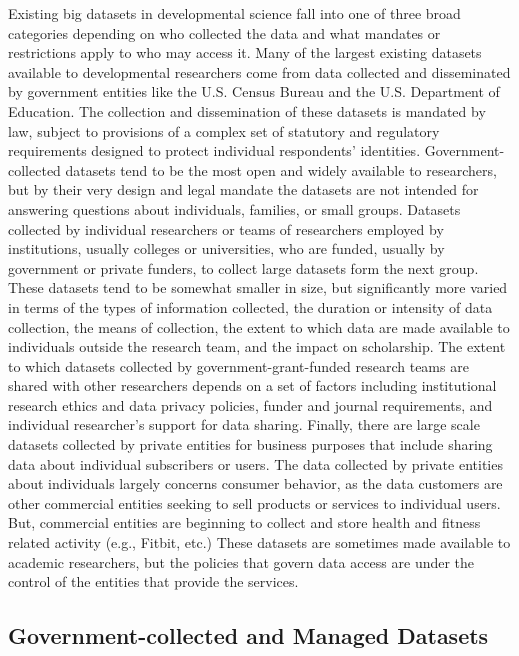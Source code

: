 \documentclass[letterpaper,man,apacite]{apa6}
\begin{document}
Existing big datasets in developmental science fall into one of three broad categories depending on who collected the data and what mandates or restrictions apply to who may access it.
Many of the largest existing datasets available to developmental researchers come from data collected and disseminated by government entities like the U.S. Census Bureau and the U.S. Department of Education.
The collection and dissemination of these datasets is mandated by law, subject to provisions of a complex set of statutory and regulatory requirements designed to protect individual respondents' identities.
Government-collected datasets tend to be the most open and widely available to researchers, but by their very design and legal mandate the datasets are not intended for answering questions about individuals, families, or small groups.
Datasets collected by individual researchers or teams of researchers employed by institutions, usually colleges or universities, who are funded, usually by government or private funders, to collect large datasets form the next group.
These datasets tend to be somewhat smaller in size, but significantly more varied in terms of the types of information collected, the duration or intensity of data collection, the means of collection, the extent to which data are made available to individuals outside the research team, and the impact on scholarship.
The extent to which datasets collected by government-grant-funded research teams are shared with other researchers depends on a set of factors including institutional research ethics and data privacy policies, funder and journal requirements, and individual researcher's support for data sharing.
Finally, there are large scale datasets collected by private entities for business purposes that include sharing data about individual subscribers or users.
The data collected by private entities about individuals largely concerns consumer behavior, as the data customers are other commercial entities seeking to sell products or services to individual users.
But, commercial entities are beginning to collect and store health and fitness related activity (e.g., Fitbit, etc.) 
These datasets are sometimes made available to academic researchers, but the policies that govern data access are under the control of the entities that provide the services.

\subsection{Government-collected and Managed Datasets}
\end{document}
